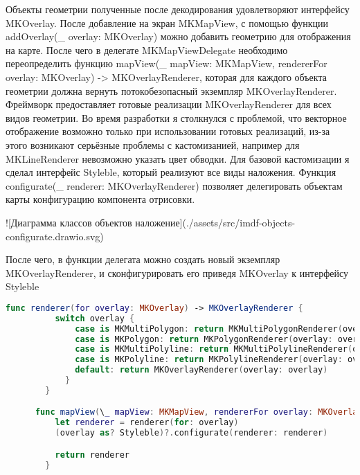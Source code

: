       Объекты геометрии полученные после декодирования удовлетворяют интерфейсу MKOverlay. После добавление на экран MKMapView, с помощью функции addOverlay(\_ overlay: MKOverlay) можно добавить геометрию для отображения на карте. После чего в делегате MKMapViewDelegate необходимо переопределить функцию mapView(\_ mapView: MKMapView, rendererFor overlay: MKOverlay) -> MKOverlayRenderer, которая для каждого объекта геометрии должна вернуть потокобезопасный экземпляр MKOverlayRenderer. Фреймворк предоставляет готовые реализации MKOverlayRenderer для всех видов геометрии. Во время разработки я столкнулся с проблемой, что векторное отображение возможно только при использовании готовых реализаций, из-за этого возникают серьёзные проблемы с кастомизанией, например для MKLineRenderer невозможно указать цвет обводки.
      Для базовой кастомизации я сделал интерфейс Styleble, который реализуют все виды наложения. Функция configurate(\_ renderer: MKOverlayRenderer) позволяет делегировать объектам карты конфигурацию компонента отрисовки.

      ![Диаграмма классов объектов наложение](./assets/src/imdf-objects-configurate.drawio.svg)

      После чего, в функции делегата можно создать новый экземпляр MKOverlayRenderer, и сконфигурировать его приведя MKOverlay к интерфейсу Styleble

      \begin{lstlisting}[language=swift,caption={Реализация функции создания и конфигурации компонентов MKOverlayRenderer}]
          func renderer(for overlay: MKOverlay) -> MKOverlayRenderer {
          switch overlay {
              case is MKMultiPolygon: return MKMultiPolygonRenderer(overlay: overlay)
              case is MKPolygon: return MKPolygonRenderer(overlay: overlay)
              case is MKMultiPolyline: return MKMultiPolylineRenderer(overlay: overlay)
              case is MKPolyline: return MKPolylineRenderer(overlay: overlay)
              default: return MKOverlayRenderer(overlay: overlay)
            }
        }

      func mapView(\_ mapView: MKMapView, rendererFor overlay: MKOverlay) -> MKOverlayRenderer {
          let renderer = renderer(for: overlay)
          (overlay as? Styleble)?.configurate(renderer: renderer)

          return renderer
        }
      \end{lstlisting}

